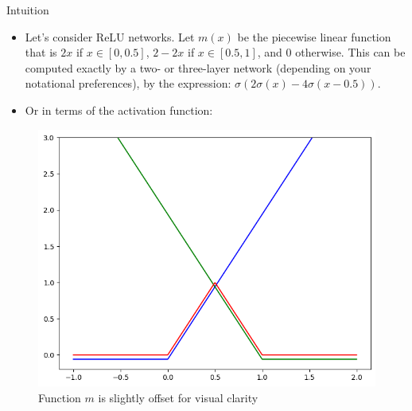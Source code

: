 \documentclass[serif, aspectratio=169]{beamer}
\begin{document}
\begin{frame}{Intuition}
	\begin{itemize}
		\item Let's consider ReLU networks. Let $m(x)$ be the piecewise linear function that is $2x$ if $x \in [0,0.5]$, $2-2x$ if $x \in[0.5,1]$, and $0$ otherwise. This can be computed exactly by a two- or three-layer network (depending on your notational preferences), by the expression: $\sigma (2 \sigma(x) - 4 \sigma(x - 0.5))$.
		\item Or in terms of the activation function:
	\end{itemize}

	\begin{center}
		\begin{figure}
			\includegraphics[keepaspectratio, scale=0.3]{pic/depth_sep_relu}
			\caption*{\scriptsize Function $m$ is slightly offset for visual clarity}
		\end{figure}
	\end{center}
\end{frame}
\end{document}
